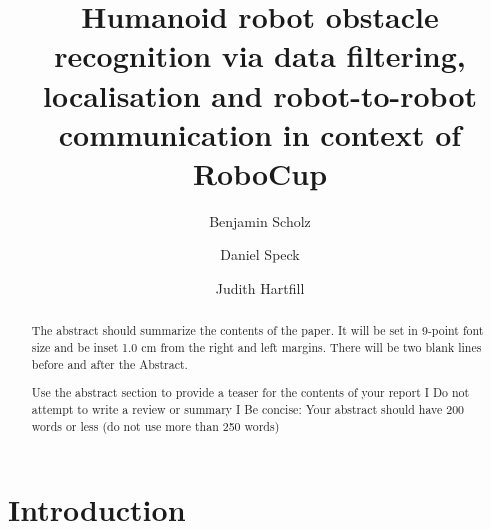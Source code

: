 \documentclass[lnicst,a4paper]{svmultln}
\begin{document}
%
\mainmatter              %
%
\title{Humanoid robot obstacle recognition via data filtering, localisation and robot-to-robot communication in context of RoboCup} 
%
%
\author{Benjamin Scholz \and Daniel Speck \and Judith Hartfill}
%
%
\tocauthor{}
%

\maketitle              %





\begin{abstract}        %
The abstract should summarize the contents of the paper. It will be set in 9-point
font size and be inset 1.0 cm from the right and left margins.
There will be two blank lines before and after the Abstract.

Use the abstract section to provide a teaser for the contents of your report I Do not attempt to write a review or summary I Be concise: Your abstract should have 200 words or less (do
not use more than 250 words)
\end{abstract}
%





\section{Introduction}
 
\end{document}
